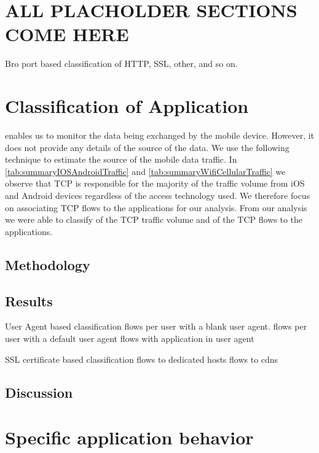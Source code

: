 \section{ALL PLACHOLDER SECTIONS COME HERE}

%

%

%

Bro port based classification of HTTP, SSL, other, and so on. 


\section{Classification of Application}

\platname enables us to monitor the data being exchanged by the mobile device. 
However, it does not provide any details of the source of the data. 
We use the following technique to estimate the source of the mobile data traffic. 
In \ref{tab:summaryIOSAndroidTraffic} and \ref{tab:summaryWifiCellularTraffic} we observe that TCP is responsible for the majority of the traffic volume from iOS and Android devices regardless of the access technology used. 
We therefore focus on associating TCP flows to the applications for our analysis. 
From our analysis we were able to classify  of the TCP traffic volume and  of the TCP flows to the applications.

\subsection{Methodology}

\subsection{Results}

User Agent based classification
flows per user with a blank user agent. 
flows per user with a default user agent 
flows with application in user agent


SSL certificate based classification
flows to dedicated hosts
flows to cdns

\subsection{Discussion}

\section{Specific application behavior}


